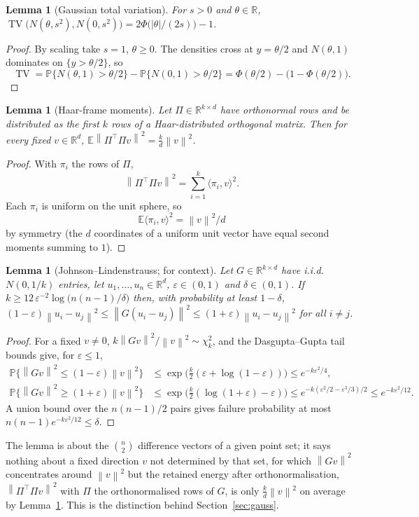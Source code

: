 \documentclass[11pt,a4paper]{article}
\newcommand{\norm}[1]{\left\|#1\right\|}
\newcommand{\E}{\mathbb{E}}
\newcommand{\Prob}{\mathbb{P}}
\newcommand{\R}{\mathbb{R}}
\newcommand{\TV}{\operatorname{TV}}
\theoremstyle{plain}
\newtheorem{lemma}[theorem]{Lemma}
\theoremstyle{definition}
\theoremstyle{remark}
\begin{document}
\begin{lemma}[Gaussian total variation]\label{lem:gausstv}
For $s>0$ and $\theta\in\R$, $\TV\bigl(N(\theta,s^2),N(0,s^2)\bigr)=2\Phi\bigl(|\theta|/(2s)\bigr)-1$.
\end{lemma}
\begin{proof}
By scaling take $s=1$, $\theta\ge0$. The densities cross at $y=\theta/2$ and $N(\theta,1)$ dominates on $\{y>\theta/2\}$, so
\[
\TV=\Prob\{N(\theta,1)>\theta/2\}-\Prob\{N(0,1)>\theta/2\}=\Phi(\theta/2)-\bigl(1-\Phi(\theta/2)\bigr).
\]
\end{proof}

\begin{lemma}[Haar-frame moments]\label{lem:haar}
Let $\Pi\in\R^{k\times d}$ have orthonormal rows and be distributed as the first $k$ rows of a Haar-distributed orthogonal matrix. Then for every fixed $v\in\R^d$, $\E\norm{\Pi^{\!\top}\Pi v}^2=\tfrac kd\norm v^2$.
\end{lemma}
\begin{proof}
With $\pi_i$ the rows of $\Pi$,
\[
\norm{\Pi^{\!\top}\Pi v}^2=\sum_{i=1}^k\langle\pi_i,v\rangle^2 .
\]
Each $\pi_i$ is uniform on the unit sphere, so
\[
\E\langle\pi_i,v\rangle^2=\norm v^2/d
\]
by symmetry (the $d$ coordinates of a uniform unit vector have equal second moments summing to $1$).
\end{proof}

\begin{lemma}[Johnson--Lindenstrauss; for context]\label{lem:jl}
Let $G\in\R^{k\times d}$ have i.i.d.\ $N(0,1/k)$ entries, let $u_1,\dots,u_n\in\R^d$, $\varepsilon\in(0,1)$ and $\delta\in(0,1)$. If $k\ge12\,\varepsilon^{-2}\log\bigl(n(n-1)/\delta\bigr)$ then, with probability at least $1-\delta$, $(1-\varepsilon)\norm{u_i-u_j}^2\le\norm{G(u_i-u_j)}^2\le(1+\varepsilon)\norm{u_i-u_j}^2$ for all $i\ne j$.
\end{lemma}
\begin{proof}
For a fixed $v\ne0$, $k\norm{Gv}^2/\norm v^2\sim\chi^2_k$, and the Dasgupta--Gupta tail bounds \cite{dasgupta2003} give, for $\varepsilon\le1$,
\begin{align*}
\Prob\bigl\{\norm{Gv}^2\le(1-\varepsilon)\norm v^2\bigr\}&\le\exp\bigl(\tfrac k2(\varepsilon+\log(1-\varepsilon))\bigr)\le e^{-k\varepsilon^2/4},\\
\Prob\bigl\{\norm{Gv}^2\ge(1+\varepsilon)\norm v^2\bigr\}&\le\exp\bigl(\tfrac k2(\log(1+\varepsilon)-\varepsilon)\bigr)\le e^{-k(\varepsilon^2/2-\varepsilon^3/3)/2}\le e^{-k\varepsilon^2/12}.
\end{align*}
A union bound over the $n(n-1)/2$ pairs gives failure probability at most $n(n-1)e^{-k\varepsilon^2/12}\le\delta$.
\end{proof}
The lemma is about the $\binom n2$ difference vectors of a given point set; it says nothing about a fixed direction $v$ not determined by that set, for which $\norm{Gv}^2$ concentrates around $\norm v^2$ but the retained energy after orthonormalisation, $\norm{\Pi^{\!\top}\Pi v}^2$ with $\Pi$ the orthonormalised rows of $G$, is only $\tfrac kd\norm v^2$ on average by Lemma~\ref{lem:haar}. This is the distinction behind Section~\ref{sec:gauss}.
\end{document}
